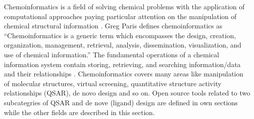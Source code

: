 Chemoinformatics is a field of solving chemical problems with the application of computational approaches paying particular attention on the manipulation of chemical structural information \cite{Leach_2007} . Greg Paris defines chemoinformatics as “Chemoinformatics is a generic term which encompasses the design, creation, organization, management, retrieval, analysis, dissemination, visualization, and use of chemical information.” The fundamental operations of a chemical information system contain storing, retrieving, and searching information/data and their relationships \cite{Gasteiger_2003}\cite{2003}. Chemoinformatics covers many areas like manipulation of molecular structures, virtual screening, quantitative structure activity relationships (QSAR), de novo design and so on. Open source tools related to two subcategries of QSAR and de nove (ligand) design are defined in own sections while the other fields are described in this section.